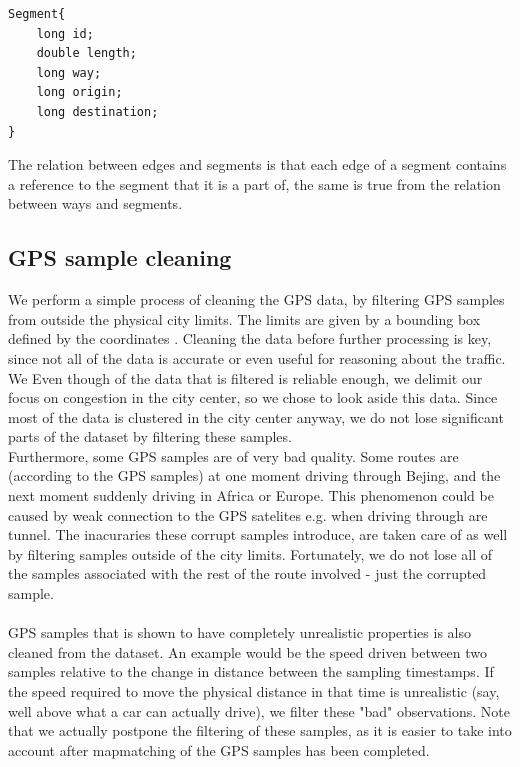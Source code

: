 \begin{lstlisting}[style=java, caption=Datastructure for a segment]
Segment{
	long id;
	double length;
	long way;
	long origin;
	long destination;
}
\end{lstlisting}

The relation between edges and segments is that each edge of a segment contains a reference to the segment that it is a part of, the same is true from the relation between ways and segments.
\subsection{GPS sample cleaning}
We perform a simple process of cleaning the GPS data, by filtering GPS samples from outside the physical city limits. The limits are given by a bounding box defined by the coordinates . Cleaning the data before further processing is key, since not all of the data is accurate or even useful for reasoning about the traffic. We Even though of the data that is filtered is reliable enough, we delimit our focus on congestion in the city center, so we chose to look aside this data. Since most of the data is clustered in the city center anyway, we do not lose significant parts of the dataset by filtering these samples.\\
Furthermore, some GPS samples are of very bad quality. Some routes are (according to the GPS samples) at one moment driving through Bejing, and the next moment suddenly driving in Africa or Europe. This phenomenon could be caused by weak connection to the GPS satelites e.g. when driving through are tunnel. The inacuraries these corrupt samples introduce, are taken care of as well by filtering samples outside of the city limits. Fortunately, we do not lose all of the samples associated with the rest of the route involved - just the corrupted sample.\\\\
GPS samples that is shown to have completely unrealistic properties is also cleaned from the dataset. An example would be the speed driven between two samples relative to the change in distance between the sampling timestamps. If the speed required to move the physical distance in that time is unrealistic (say, well above what a car can actually drive), we filter these "bad" observations. Note that we actually postpone the filtering of these samples, as it is easier to take into account after mapmatching of the GPS samples has been completed. 

